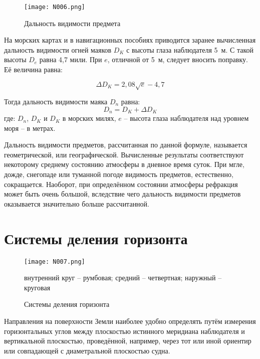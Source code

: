 \begin{figure*}[htb]
  \centering{}
  \texttt{[image: N006.png]}
  \caption{Дальность видимости предмета}
  \label{fig:N6}
\end{figure*}

На морских картах и в навигационных пособиях приводится заранее
вычисленная дальность видимости огней маяков $D_K$ с высоты глаза
наблюдателя 5~м. С такой высоты $D_e$ равна 4,7 мили. При $e$,
отличной от 5~м, следует вносить поправку. Её величина равна:

\begin{equation}
  \Delta D_K = 2,08 \sqrt{e} - 4,7 
\end{equation}

Тогда дальность видимости маяка $D_n$ равна: 
%
\begin{equation}
  D_n = D_K +  \Delta D_K 
\end{equation}
%
где: $D_n$, $D_K$ и $D_K$ в морских милях, $e$ \--- высота глаза
наблюдателя над уровнем моря \--- в метрах.
 
Дальность видимости предметов, рассчитанная по данной формуле,
называется геометрической, или географической. Вычисленные результаты
соответствуют некоторому среднему состоянию атмосферы в дневное время
суток. При мгле, дожде, снегопаде или туманной погоде видимость
предметов, естественно, сокращается. Наоборот, при определённом
состоянии атмосферы рефракция может быть очень большой, вследствие
чего дальность видимости предметов оказывается значительно больше
рассчитанной.

\section{Системы деления горизонта}

\begin{figure}[htb]
  \centering{}
  \texttt{[image: N007.png]}
  \caption{Системы деления горизонта}
  \label{fig:N7}
  \small
  \centering{}
  внутренний круг \--- румбовая; средний \--- четвертная; наружный \--- круговая
\end{figure}

Направления на поверхности Земли наиболее удобно определять путём
измерения горизонтальных углов между плоскостью истинного меридиана
наблюдателя и вертикальной плоскостью, проведённой, например, через
тот или иной ориентир или совпадающей с диаметральной плоскостью
судна.

